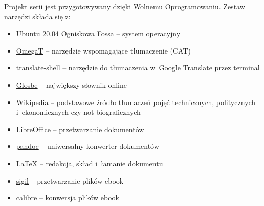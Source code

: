 \documentclass[oneside,polish,11pt,sfheadings]{mwbk}
\begin{document}
Projekt serii jest przygotowywany dzięki Wolnemu Oprogramowaniu. Zestaw narzędzi składa się z:
\begin{itemize}
\item \href{https://ubuntu.com/}{Ubuntu 20.04 Ogniskowa Fossa} -- system operacyjny
\item \href{https://omegat.org/}{OmegaT} -- narzędzie wspomagające tłumaczenie (CAT)
\item \href{https://github.com/soimort/translate-shell}{translate-shell} -- narzędzie do tłumaczenia w~\href{https://translate.google.pl}{Google Translate} przez terminal 
\item \href{https://glosbe.com/en/pl}{Glosbe} -- największy słownik online
\item \href{https://www.wikipedia.org/}{Wikipedia} -- podstawowe źródło tłumaczeń pojęć technicznych, politycznych i~ekonomicznych czy not biograficznych
\item \href{https://www.libreoffice.org/}{LibreOffice} -- przetwarzanie dokumentów 
\item \href{http://pandoc.org}{pandoc} -- uniwersalny konwerter dokumentów 
\item \href{https://www.latex-project.org/}{LaTeX} -- redakcja, skład i~łamanie dokumentu
\item \href{https://sigil-ebook.com/}{sigil} -- przetwarzanie plików ebook
\item \href{https://calibre-ebook.com/}{calibre} -- konwersja plików ebook
\end{itemize}




\tableofcontents{}
\end{document}
